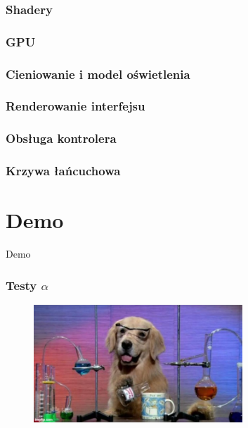 \documentclass[aspectratio=169]{beamer}
\begin{document}
\begin{frame}[allowframebreaks]
	\frametitle{Shadery}
	
\end{frame}

\begin{frame}[allowframebreaks]
	\frametitle{GPU}
	
\end{frame}

\begin{frame}[allowframebreaks]
	\frametitle{Cieniowanie i model oświetlenia}
	
\end{frame}

\begin{frame}[allowframebreaks]
	\frametitle{Renderowanie interfejsu}
	
\end{frame}

\begin{frame}[allowframebreaks]
	\frametitle{Obsługa kontrolera}
	
\end{frame}

\begin{frame}[allowframebreaks]
	\frametitle{Krzywa łańcuchowa}
	
\end{frame}

\section{Demo}

\begin{frame}
	  \begin{center}
	\Huge Demo
	\end{center}
\end{frame}


\begin{frame}
	\frametitle{Testy $\alpha$} %
	\begin{figure}
		\centering
		\includegraphics[width=0.7\textwidth]{dog.jpg}
	\end{figure}
\end{frame}
\end{document}
